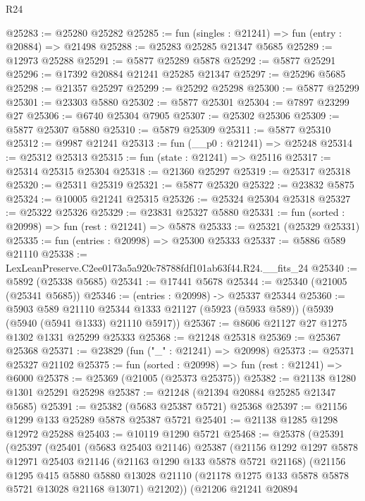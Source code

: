 \begin{lexlean}{R24}
\begin{coremodule}
@25283 := @25280 @25282
@25285 := fun (singles : @21241) => fun (entry : @20884) => @21498
@25288 := @25283 @25285 @21347 @5685
@25289 := @12973 @25288
@25291 := @5877 @25289 @5878
@25292 := @5877 @25291
@25296 := @17392 @20884 @21241 @25285 @21347
@25297 := @25296 @5685
@25298 := @21357 @25297
@25299 := @25292 @25298
@25300 := @5877 @25299
@25301 := @23303 @5880
@25302 := @5877 @25301
@25304 := @7897 @23299 @27
@25306 := @6740 @25304 @7905
@25307 := @25302 @25306
@25309 := @5877 @25307 @5880
@25310 := @5879 @25309
@25311 := @5877 @25310
@25312 := @9987 @21241
@25313 := fun (__p0 : @21241) => @25248
@25314 := @25312 @25313
@25315 := fun (state : @21241) => @25116
@25317 := @25314 @25315 @25304
@25318 := @21360 @25297
@25319 := @25317 @25318
@25320 := @25311 @25319
@25321 := @5877 @25320
@25322 := @23832 @5875
@25324 := @10005 @21241 @25315
@25326 := @25324 @25304 @25318
@25327 := @25322 @25326
@25329 := @23831 @25327 @5880
@25331 := fun (sorted : @20998) => fun (rest : @21241) => @5878
@25333 := @25321 (@25329 @25331)
@25335 := fun (entries : @20998) => @25300 @25333
@25337 := @5886 @589 @21110
@25338 := LexLeanPreserve.C2ee0173a5a920c78788fdf101ab63f44.R24.__fits_24
@25340 := @5892 (@25338 @5685)
@25341 := @17441 @5678
@25344 := @25340 (@21005 (@25341 @5685))
@25346 := (entries : @20998) -> @25337 @25344
@25360 := @5903
    @589
    @21110
    @25344
    @1333
    @21127
    (@5923 (@5933 @589))
    (@5939 (@5940 (@5941 @1333) @21110 @5917))
@25367 := @8606 @21127 @27 @1275 @1302 @1331 @25299 @25333
@25368 := @21248 @25318
@25369 := @25367 @25368
@25371 := @23829 (fun ("_" : @21241) => @20998)
@25373 := @25371 @25327 @21102
@25375 := fun (sorted : @20998) => fun (rest : @21241) => @6000
@25378 := @25369 (@21005 (@25373 @25375))
@25382 := @21138 @1280 @1301 @25291 @25298
@25387 := @21248 (@21394 @20884 @25285 @21347 @5685)
@25391 := @25382 (@5683 @25387 @5721) @25368
@25397 := @21156 @1299 @133 @25289 @5878 @25387 @5721
@25401 := @21138 @1285 @1298 @12972 @25288
@25403 := @10119 @1290 @5721
@25468 := @25378
    (@25391
      (@25397
        (@25401
          (@5683 @25403 @21146)
          @25387
          (@21156
            @1292
            @1297
            @5878
            @12971
            @25403
            @21146
            (@21163 @1290 @133 @5878 @5721 @21168)
            (@21156
              @1295
              @415
              @5880
              @5880
              @13028
              @21110
              (@21178 @1275 @133 @5878 @5878 @5721 @13028 @21168 @13071)
              @21202))
          (@21206
            @21241
            @20894

\end{coremodule}
\end{lexlean}
